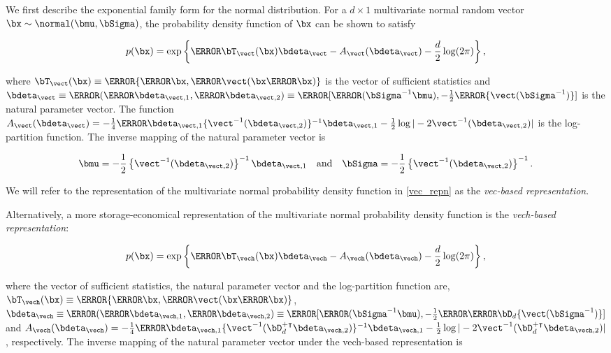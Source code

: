 \documentclass[12pt]{article}
\theoremstyle{plain}
\theoremstyle{definition}
\theoremstyle{remark}
\begin{document}
We first describe the exponential family form for the normal distribution.
For a $d \times 1$ multivariate normal
random vector $\bx \sim \normal (\bmu, \bSigma)$, the probability density function of $\bx$ can be shown to satisfy

\begin{equation}
	p(\bx) = \exp \left\{ \T{\bT_{\vect} (\bx)} \bdeta_{\vect} - A_{\vect} (\bdeta_{\vect}) - \frac{d}{2} \log (2 \pi) \right\},
\label{vec_repn}
\end{equation}

\noindent where $\bT_{\vect} (\bx) \equiv \T{\{ \T{\bx}, \T{\vect ( \bx \T{\bx} )} \}}$ is the vector of sufficient statistics
and $\bdeta_{\vect} \equiv \T{( \T{\bdeta_{\vect, 1}}, \T{\bdeta_{\vect, 2}} )} \equiv \T{[ \T{( \bSigma^{-1} \bmu )},
-\frac12 \T{\{ \vect (\bSigma^{-1}) \}} ]}$ is the natural parameter vector.
The function $A_{\vect} (\bdeta_{\vect}) =
-\frac14 \T{\bdeta}_{\vect, 1} \{ \vect^{-1} (\bdeta_{\vect, 2}) \}^{-1} \bdeta_{\vect, 1}
- \frac12 \log | -2 \vect^{-1} (\bdeta_{\vect, 2}) |$ is the log-partition function.
The inverse mapping of the natural parameter vector is \cite[equation~S.4]{wand17}

\begin{equation}
	\bmu = -\frac12 \left\{ \vect^{-1} (\bdeta_{\vect, 2}) \right\}^{-1} \bdeta_{\vect, 1} \quad
	\text{and} \quad
	\bSigma = -\frac12 \left\{ \vect^{-1} (\bdeta_{\vect, 2}) \right\}^{-1}.
\label{gauss_vec_comm_params}
\end{equation}

\noindent We will refer to the representation of the multivariate normal probability density function in
\eqref{vec_repn} as the \emph{vec-based representation}.

Alternatively, a more storage-economical
representation of the multivariate normal probability density function is the \emph{vech-based representation}:

\[
	p (\bx) = \exp \left\{ \T{\bT_{\vech} (\bx)} \bdeta_{\vech} - A_{\vech} (\bdeta_{\vech}) - \frac{d}{2} \log (2 \pi) \right\},
\]

\noindent where the vector of sufficient statistics, the natural parameter vector and the log-partition function are,
$\bT_{\vech} (\bx) \equiv \T{\{ \T{\bx}, \T{\vect ( \bx \T{\bx} )} \}}$,
$\bdeta_{\vech} \equiv \T{( \T{\bdeta_{\vech, 1}}, \T{\bdeta_{\vech, 2}} )} \equiv \T{[ \T{( \bSigma^{-1} \bmu )}, \allowbreak
-\frac12 \T{ \T{\bD_d} \{ \vect (\bSigma^{-1}) \}} ]}$ and
$A_{\vech} (\bdeta_{\vech}) = -\frac14 \T{\bdeta}_{\vech, 1} \{ \vect^{-1} (\bD_d^{+ \intercal} \bdeta_{\vech, 2}) \}^{-1}
\bdeta_{\vech, 1} - \frac12 \log | -2 \vect^{-1} (\bD_d^{+ \intercal} \bdeta_{\vech, 2}) |$, respectively.
The inverse mapping of the natural parameter vector under the vech-based representation is
\end{document}
